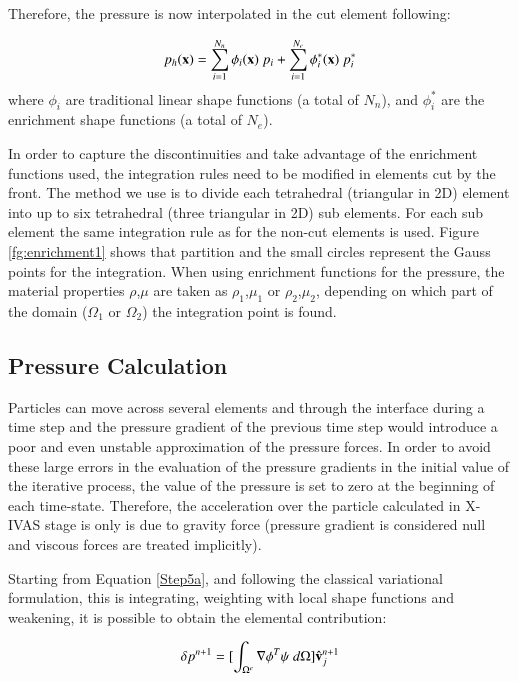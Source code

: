    Therefore, the pressure is now interpolated in the cut element following:

   \begin{equation}
      p_h(\mathbf{x}) = \sum_{i=1}^{N_n} \phi_i(\mathbf{x}) \ p_i + \sum_{i=1}^{N_e} \phi_i^*(\mathbf{x}) \ p_i^*
   \end{equation}
   where $\phi_i$ are traditional linear shape functions (a total of $N_n$), and $\phi_i^*$ are the enrichment shape functions (a total of $N_e$).

   In order to capture the discontinuities and take advantage of the enrichment functions used, the integration rules need to be modified in elements cut by the front. The method we use is to divide each  tetrahedral (triangular in 2D) element into up to six tetrahedral
  (three triangular in 2D) sub elements. For each sub element the same integration rule as for the non-cut elements is used. Figure \ref{fg:enrichment1} shows that partition and the small circles represent the Gauss points for the integration. When using enrichment functions for the pressure, the material properties $\rho$,$\mu$ are taken as $\rho_1$,$\mu_1$ or $\rho_2$,$\mu_2$, depending on which part of the domain ($\Omega_1$ or $\Omega_2$) the integration point is found.

   \subsection{Pressure Calculation}

Particles can move across several elements and through the interface during a time step and the pressure gradient of the previous time step would introduce a poor and even unstable approximation of the pressure forces. In order to avoid these large errors in the evaluation of the pressure gradients in the initial value of the iterative process, the value of the pressure is set to zero at the beginning of each time-state. Therefore, the acceleration over the particle calculated in X-IVAS stage is only is due to gravity force (pressure gradient is considered null and viscous forces are treated implicitly)\cite{Idelsohn13c}.

Starting from Equation \ref{Step5a}, and following the classical variational formulation, this is integrating, weighting with local shape functions and weakening, it is possible to obtain the elemental contribution:

\begin{equation}
   [\Delta t \int_{\Omega^e} \frac{1}{\rho} \nabla \phi^T \nabla \phi \ d\Omega] \delta p^{n+1} = [\int_{\Omega^e} \nabla \phi^T \psi \ d\Omega] \hat \vv_j^{n+1}
\end{equation}

